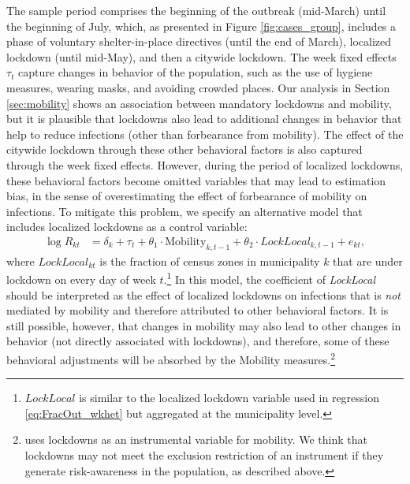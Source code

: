 The sample period comprises  the beginning of the outbreak (mid-March) until the beginning of July, which, as presented in Figure \ref{fig:cases_group}, includes a phase of voluntary shelter-in-place directives (until the end of March), localized lockdown (until mid-May), and then a citywide lockdown. The week fixed effects $\tau_t$ capture changes in behavior of the population, such as the use of hygiene measures, wearing masks, and avoiding crowded places. Our analysis in Section \ref{sec:mobility} shows an association between mandatory lockdowns and mobility, but it is plausible that lockdowns also lead to additional changes in behavior that help to reduce infections (other than forbearance from mobility). The effect of the citywide lockdown through these other behavioral factors is also captured through the week fixed effects. However, during the period of localized lockdowns, these behavioral factors become omitted variables that may lead to estimation bias, in the sense of overestimating the effect of forbearance of mobility on infections. To mitigate this problem, we specify an alternative model that includes localized lockdowns as a control variable:
\begin{align} %
\log{R_{kt}}&=\delta_{k}+\tau_{t}+\theta_1\cdot \mbox{Mobility}_{k,t-1} + \theta_2\cdot LockLocal_{k,t-1} + e_{kt}, \label{eq:mob_lock}
\end{align}
where $LockLocal_{kt}$ is the fraction of census zones in municipality $k$ that are under lockdown on every day of week $t$.\footnote{$LockLocal$ is similar to the localized lockdown variable used in regression \eqref{eq:FracOut_wkhet} but aggregated at the municipality level.}  In this model, the coefficient of \textit{LockLocal} should be interpreted as the effect of localized lockdowns on infections that is \textit{not} mediated by mobility and therefore attributed to other behavioral factors. It is still possible, however, that changes in mobility may also lead to other changes in behavior (not directly associated with lockdowns), and therefore, some of these behavioral adjustments will be absorbed by the Mobility measures.\footnote{\cite{jung2021} uses lockdowns as an instrumental variable for mobility. We think that lockdowns may not meet the exclusion restriction of an instrument if they  generate risk-awareness in the population, as described above.}

